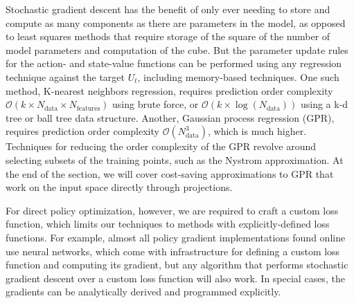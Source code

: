 \documentclass{article}
\begin{document}
Stochastic gradient descent has the benefit of only ever needing to store and compute as many components as there are parameters in the model, as opposed to least squares methods that require storage of the square of the number of model parameters and computation of the cube. But the parameter update rules for the action- and state-value functions can be performed using any regression technique against the target $U_t$, including memory-based techniques. One such method, K-nearest neighbors regression, requires prediction order complexity $\mathcal{O}(k\times N_\text{data}\times N_\text{features})$ using brute force, or $\mathcal{O}(k\times \log(N_\text{data}))$ using a k-d tree or ball tree data structure. Another, Gaussian process regression (GPR), requires prediction order complexity $\mathcal{O}(N_\text{data}^3)$, which is much higher. Techniques for reducing the order complexity of the GPR revolve around selecting subsets of the training points, such as the Nystrom approximation\cite{nystrom}. At the end of the section, we will cover cost-saving approximations to GPR that work on the input space directly through projections\cite{GP_BLR}.

For direct policy optimization, however, we are required to craft a custom loss function, which limits our techniques to methods with explicitly-defined loss functions. For example, almost all policy gradient implementations found online use neural networks, which come with infrastructure for defining a custom loss function and computing its gradient, but any algorithm that performs stochastic gradient descent over a custom loss function will also work. In special cases, the gradients can be analytically derived and programmed explicitly. 
\end{document}
